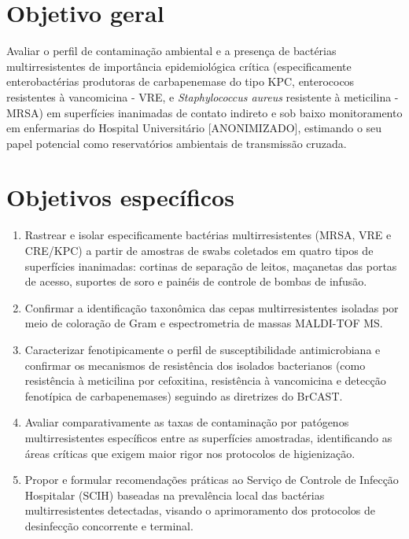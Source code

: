\documentclass[12pt,a4paper]{article}
\begin{document}
\section{Objetivo geral}
Avaliar o perfil de contaminação ambiental e a presença de bactérias multirresistentes de importância epidemiológica crítica (especificamente enterobactérias produtoras de carbapenemase do tipo KPC, enterococos resistentes à vancomicina - VRE, e \textit{Staphylococcus aureus} resistente à meticilina - MRSA) em superfícies inanimadas de contato indireto e sob baixo monitoramento em enfermarias do Hospital Universitário [ANONIMIZADO], estimando o seu papel potencial como reservatórios ambientais de transmissão cruzada.

\section{Objetivos específicos}
\begin{enumerate}
    \item Rastrear e isolar especificamente bactérias multirresistentes (MRSA, VRE e CRE/KPC) a partir de amostras de swabs coletados em quatro tipos de superfícies inanimadas: cortinas de separação de leitos, maçanetas das portas de acesso, suportes de soro e painéis de controle de bombas de infusão.
    \item Confirmar a identificação taxonômica das cepas multirresistentes isoladas por meio de coloração de Gram e espectrometria de massas MALDI-TOF MS.
    \item Caracterizar fenotipicamente o perfil de susceptibilidade antimicrobiana e confirmar os mecanismos de resistência dos isolados bacterianos (como resistência à meticilina por cefoxitina, resistência à vancomicina e detecção fenotípica de carbapenemases) seguindo as diretrizes do BrCAST.
    \item Avaliar comparativamente as taxas de contaminação por patógenos multirresistentes específicos entre as superfícies amostradas, identificando as áreas críticas que exigem maior rigor nos protocolos de higienização.
    \item Propor e formular recomendações práticas ao Serviço de Controle de Infecção Hospitalar (SCIH) baseadas na prevalência local das bactérias multirresistentes detectadas, visando o aprimoramento dos protocolos de desinfecção concorrente e terminal.
\end{enumerate}
\newpage

\end{document}
